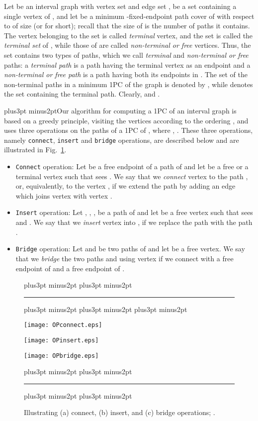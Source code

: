 \documentclass[10pt]{article}
\def\yskip{\penalty-50\vskip3pt plus3pt minus2pt}
\def\y{\yskip}
\def\yy{\yskip\yskip}
\def\yyy{\yskip\yskip\yskip}
\begin{document}
Let  be an interval graph with vertex set  and edge set
,  be a set containing a single vertex of
, and let  be a minimum
-fixed-endpoint path cover of  with respect to 
of size  (or  for
short); recall that the size of  is
the number of paths it contains. The vertex belonging to the set
 is called {\it terminal} vertex, and the set
 is called the {\it terminal set} of , while those
of  are called {\it non-terminal or free}
vertices. Thus, the set  contains
two types of paths, which we call {\it terminal} and {\it
non-terminal or free} paths: a {\it terminal path}  is a path
having the terminal vertex as an endpoint and a {\it non-terminal
or free path}  is a path having both its endpoints in . The set of the non-terminal paths in a minimum 1PC
of the graph  is denoted by , while  denotes the set
containing the terminal path. Clearly,  and
.

\y Our algorithm for computing a 1PC of an interval graph is based
on a greedy principle, visiting the vertices according to the
ordering , and uses
three operations on the paths of a 1PC of , where , . These three operations,
namely {\tt connect}, {\tt insert} and {\tt bridge} operations,
are described below and are illustrated in Fig.~\ref{operations}.

\begin{itemize}

\item []
{\tt Connect} operation: Let  be a free endpoint of a path
 of  and let  be a
free or a terminal vertex such that  sees . We say
that we {\it connect} vertex  to the path , or,
equivalently, to the vertex , if we extend the path  by
adding an edge which joins vertex  with vertex .



\item [] {\tt Insert} operation: Let , , , be a
path of  and let  be a
free vertex such that  sees  and . We say that
we {\it insert} vertex  into , if we replace the path
 with the path .

\item [] {\tt Bridge} operation: Let  and  be two
paths of  and let  be a
free vertex. We say that we {\it bridge} the two paths  and
 using vertex  if we connect  with a free
endpoint of  and a free endpoint of .

\end{itemize}

\begin{figure}[t]
\yy \hrule \yyy
  \centering
   \begin{minipage}[c]{2in}
    \centering
    \texttt{[image: OPconnect.eps]}
  \end{minipage}
  \begin{minipage}[c]{2in}
    \centering
    \texttt{[image: OPinsert.eps]}
  \end{minipage}
  \begin{minipage}[c]{2in}
    \centering
    \texttt{[image: OPbridge.eps]}
  \end{minipage}
\caption{\small{Illustrating (a) connect, (b) insert, and (c) bridge operations; .}} \yy \hrule \y\y
\label{operations}
\end{figure}
\end{document}
